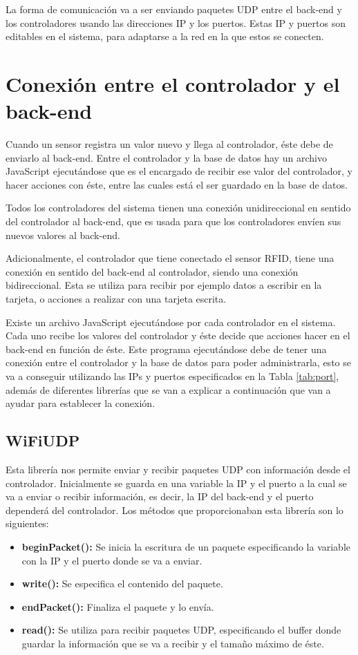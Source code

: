 La forma de comunicación va a ser enviando paquetes UDP entre el back-end y los controladores usando las direcciones IP y los puertos. Estas IP y puertos son editables en el sistema, para adaptarse a la red en la que estos se conecten.

\section{Conexión entre el controlador y el back-end}

Cuando un sensor registra un valor nuevo y llega al controlador, éste debe de enviarlo al back-end. Entre el controlador y la base de datos hay un archivo JavaScript ejecutándose que es el encargado de recibir ese valor del controlador, y hacer acciones con éste, entre las cuales está el ser guardado en la base de datos.

Todos los controladores del sistema tienen una conexión unidireccional en sentido del controlador al back-end, que es usada para que los controladores envíen sus nuevos valores al back-end.

Adicionalmente, el controlador que tiene conectado el sensor RFID, tiene una conexión en sentido del back-end al controlador, siendo una conexión bidireccional. Esta se utiliza para recibir por ejemplo datos a escribir en la tarjeta, o acciones a realizar con una tarjeta escrita.

Existe un archivo JavaScript ejecutándose por cada controlador en el sistema. Cada uno recibe los valores del controlador y éste decide que acciones hacer en el back-end en función de éste. Este programa ejecutándose debe de tener una conexión entre el controlador y la base de datos para poder administrarla, esto se va a conseguir utilizando las IPs y puertos especificados en la Tabla \ref{tab:port}, además de diferentes librerías que se van a explicar a continuación que van a ayudar para establecer la conexión.

\subsection{WiFiUDP}
Esta librería nos permite enviar y recibir paquetes UDP con información desde el controlador. Inicialmente se guarda en una variable la IP y el puerto a la cual se va a enviar o recibir información, es decir, la IP del back-end y el puerto dependerá del controlador. Los métodos que proporcionaban esta librería son lo siguientes:

\begin{itemize}
    \item \textbf{beginPacket():} Se inicia la escritura de un paquete especificando la variable con la IP y el puerto donde se va a enviar.
    \item  \textbf{write():} Se especifica el contenido del paquete.
    \item  \textbf{endPacket():} Finaliza el paquete y lo envía.
    \item  \textbf{read():} Se utiliza para recibir paquetes UDP, especificando el buffer donde guardar la información que se va a recibir y el tamaño máximo de éste.
\end{itemize}

